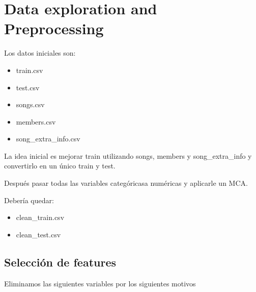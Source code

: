 \documentclass[a4paper]{article}
\begin{document}


\section{Data exploration and Preprocessing}

Los datos iniciales son: 
\begin{itemize}
\item train.csv
\item test.csv
\item songs.csv
\item members.csv
\item song\_extra\_info.csv
\end{itemize}

La idea inicial es mejorar train utilizando songs, members y song\_extra\_info y convertirlo en un único train y test. 

Después pasar todas las variables categóricasa numéricas y aplicarle un MCA.

Debería quedar: 
\begin{itemize}
\item clean\_train.csv
\item clean\_test.csv
\end{itemize}


\subsection{Selección de features}

Eliminamos las siguientes variables por los siguientes motivos
\end{document}
